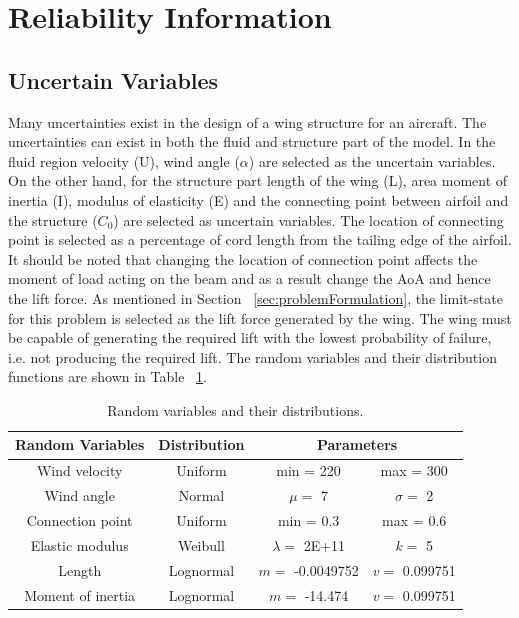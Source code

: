 \documentclass[paper=a4, fontsize=12pt]{scrartcl} %
\begin{document}
\section{Reliability Information}
\subsection{Uncertain Variables}
Many uncertainties exist in the design of a wing structure for an aircraft. The uncertainties can exist in both the fluid and structure part of the model. In the fluid region velocity (U), wind angle ($\alpha$) are selected as the uncertain variables. On the other hand, for the structure part length of the wing (L), area moment of inertia (I), modulus of elasticity (E) and the connecting point between airfoil and the structure ($C_0$) are selected as uncertain variables. The location of connecting point is selected as a percentage of cord length from the tailing edge of the airfoil. It should be noted that changing the location of connection point affects the moment of load acting on the beam and as a result change the AoA and hence the lift force. As mentioned in Section ~\ref{sec:problemFormulation}, the limit-state for this problem is selected as the lift force generated by the wing. The wing must be capable of generating the required lift with the lowest probability of failure, i.e. not producing the required lift. The random variables and their distribution functions are shown in Table ~\ref{table:radom_variables}.
%
\begin{table}[H]
\centering
\begin{tabular}{ c | c | c | c }
	Random Variables & Distribution & \multicolumn{2}{|c}{Parameters} \\
	\hline                       
	\hline
		Wind velocity & Uniform & min = 220 & max = 300 \\
		Wind angle & Normal & $\mu = $ 7 & $\sigma = $ 2 \\
		Connection point & Uniform & min = 0.3 & max = 0.6 \\
		Elastic modulus & Weibull & $\lambda = $ 2E+11 & $k = $ 5 \\
		Length & Lognormal & $m = $ -0.0049752 & $v = $ 0.099751 \\
		Moment of inertia & Lognormal & $m = $ -14.474 & $v = $ 0.099751 \\
	\hline  
\end{tabular}
\caption{Random variables and their distributions.}
\label{table:radom_variables}
\end{table}
\end{document}
